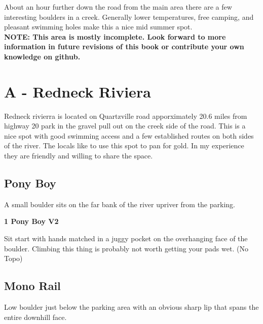 

\raggedcolumns
\begin{multicols}{2}
About an hour further down the road from the main area there are a few interesting boulders in a creek. Generally lower temperatures, free camping, and pleasant swimming holes make this a nice mid summer spot.\\

\textbf{NOTE: This area is mostly incomplete. Look forward to more information in future revisions of this book or contribute your own knowledge on github.}\\

\newpage

		\section{A - Redneck Riviera}\label{sa:Redneck Riviera}
	Redneck rivierra is located on Quartzville road apporximately 20.6 miles from highway 20 park in the gravel pull out on the creek side of the road. This is a nice spot with good swimming access and a few established routes on both sides of the river. The locals like to use this spot to pan for gold. In my experience they are friendly and willing to share the space.\\

	
			\subsection*{Pony Boy}\label{bf:Pony Boy}
			A small boulder sits on the far bank of the river upriver from the parking.\\
			
					\label{rt:Pony Boy}
\colorbox{green!20}{
\parbox{0.95\linewidth}{
\textbf{
1 Pony Boy V2  
}
}
}

					\begin{adjustwidth}{0.5cm}{}				
					Sit start with hands matched in a juggy pocket on the overhanging face of the boulder. Climbing this thing is probably not worth getting your pads wet.
						\newline (No Topo) 
					\end{adjustwidth}
			\subsection*{Mono Rail}\label{bf:Mono Rail}
			Low boulder just below the parking area with an obvious sharp lip that spans the entire downhill face.\\
			

\end{multicols}
